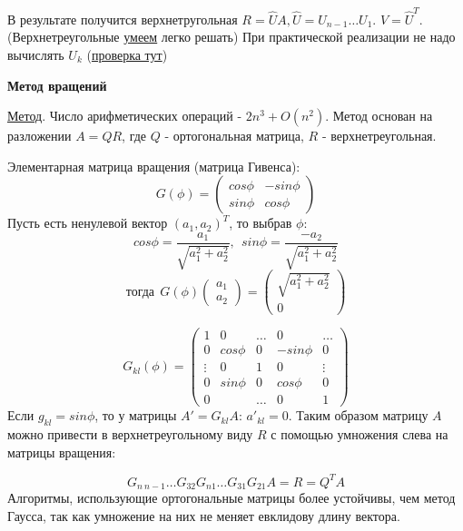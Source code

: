 \documentclass[specialist, subf, href, colorlinks=true, 12pt, times, mtpro, final]{disser}
\theoremstyle{definition}
\begin{document}
{	В результате получится верхнетругольная $R = \hat{U} A, \hat{U} = U_{n-1} \dots U_1$. $V = \hat{U}^T$. (Верхнетреугольные \hyperlink {lects.51}{умеем} легко решать) При практической реализации не надо вычислять $U_k$ (\hyperlink {lects.55}{проверка тут}) 
	 
	\begin{center} \textbf{Метод вращений} \end{center}

	\hyperlink {lects.55}{Метод}. Число арифметических операций - $2n^3 + O(n^2)$. Метод основан на разложении $A = QR$, где $Q$ - ортогональная матрица, $R$ - верхнетреугольная.

	Элементарная матрица вращения (матрица Гивенса):
	$$
	G(\phi) = \left(
	\begin{array}{cc}
		cos \phi  & -sin \phi \\
		sin \phi & cos \phi
		\end{array}
		\right)
	$$
	Пусть есть ненулевой вектор $(a_1, a_2)^T$, то выбрав $\phi:$ 
	$$cos \phi = \frac{a_1}{\sqrt{a_1^2 + a_2^2}}, \ \ sin \phi = \frac{-a_2}{\sqrt{a_1^2 + a_2^2}}$$
	$$ \text{тогда} \ \ G(\phi) \left( \begin{array}{cc}
		a_1 \\
		a_2
		\end{array} \right) = \left( \begin{array}{cc}
		\sqrt{a_1^2 + a_2^2} \\
		0
		\end{array} \right)$$

	$$
	G_{kl}(\phi) = \left(
	\begin{array}{ccccc}
		1 & 0 & \dots & 0 & \dots \\
		0 & cos \phi & 0 & -sin \phi & 0 \\
		\vdots & 0 & 1 & 0 & \vdots \\
		0 & sin \phi & 0 & cos \phi & 0 \\
		0 & & \dots & 0 & 1 		
		\end{array}
		\right)	
	$$
	Если $g_{kl} = sin \phi$, то у матрицы $A' = G_{kl} A$: $a'_{kl} = 0$. Таким образом матрицу $A$ можно привести в верхнетреугольному виду $R$ с помощью умножения слева на матрицы вращения:

	$$
	G_{n \ n-1} \dots G_{32} G_{n1} \dots G_{31} G_{21} A = R = Q^T A	
	$$ 
	Алгоритмы, использующие ортогональные матрицы более устойчивы, чем метод Гаусса, так как умножение на них не меняет евклидову длину вектора.

}
\end{document}
